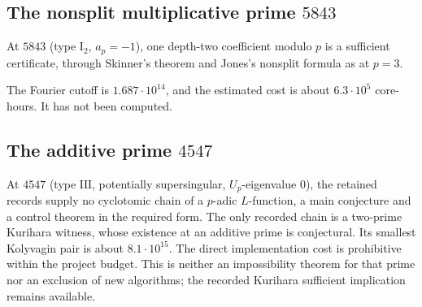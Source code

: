 \subsection{The nonsplit multiplicative prime $5843$}
\begin{criterion}\label{crit:5843}
At $5843$ (type $\mathrm{I}_2$, $a_p=-1$), one depth-two coefficient modulo $p$ is a sufficient certificate, through Skinner's theorem and Jones's nonsplit formula as at $p=3$.
\end{criterion}
The Fourier cutoff is $1.687\cdot10^{14}$, and the estimated cost is about $6.3\cdot10^5$ core-hours. It has not been computed.

\subsection{The additive prime $4547$}
\begin{remark}\label{prop:4547}
At $4547$ (type $\mathrm{III}$, potentially supersingular, $U_p$-eigenvalue $0$), the retained records supply no cyclotomic chain of a $p$-adic $L$-function, a main conjecture and a control theorem in the required form. The only recorded chain is a two-prime Kurihara witness, whose existence at an additive prime is conjectural. Its smallest Kolyvagin pair is about $8.1\cdot10^{15}$.
The direct implementation cost is prohibitive within the project budget. This is neither an impossibility theorem for that prime nor an exclusion of new algorithms; the recorded Kurihara sufficient implication remains available.
\end{remark}
